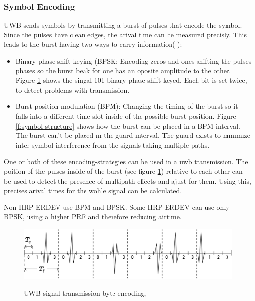 \subsubsection{Symbol Encoding}
UWB sends symbols by transmitting a burst of pulses that encode the symbol.
Since the pulses have clean edges, the arival time can be measured precisly.
This leads to the burst having two ways to carry information( \cite{QorvoGettingBacktoBasics}):
\begin{itemize}
  \item Binary phase-shift keying (BPSK: Encoding zeros and ones shifting the pulses phases so the burst beak for one has an oposite amplitude to the other. 
Figure \ref{f:UWB_signal_description} shows the singal 101 binary phase-shift keyed. 
Each bit is set twice, to detect problems with transmission.
  \item Burst position modulation (BPM): Changing the timing of the burst so it falls into a different time-slot inside of the possible burst position.	
Figure \ref{f:symbol structure} shows how the burst can be placed in a BPM-interval. 
The burst can't be placed in the guard interval. 
The guard exists to minimize inter-symbol interference from the
signals taking multiple paths.
\end{itemize}

One or both of these encoding-strategies can be used in a uwb transmission.
The poition of the pulses inside of the burst (see figure \ref{f:UWB_signal_description})  relative to each other can be used to detect the presence of multipath effects and ajust for them. 
Using this, precises arival times for the wohle signal can be calculated.

Non-HRP ERDEV use BPM and BPSK.
Some HRP-ERDEV can use only BPSK, using a higher PRF and therefore reducing airtime.


\begin{figure}[ht!]
\centering
 \caption{UWB signal transmission byte encoding, \cite{QorvoGettingBacktoBasics}}
\includegraphics[width=\linewidth]{graphics/uwb_signal_tramsmission.png}
\label{f:UWB_signal_description}
\end{figure}


